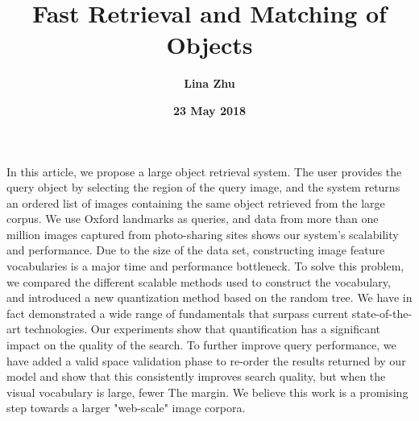 \documentclass[a4paper,12pt]{article}
\begin{document}
%
 \title{\textbf{\bfseries \LARGE Fast Retrieval and Matching of Objects} }
\author{\textbf{Lina Zhu}}
\date{\textbf{23 May 2018}}
\maketitle	
\par	In this article, we propose a large object retrieval system. The user provides the query object by selecting the region of the query image, and the system returns an ordered list of images containing the same object retrieved from the large corpus. We use Oxford landmarks as queries, and data from more than one million images captured from photo-sharing sites shows our system's scalability and performance. Due to the size of the data set, constructing image feature vocabularies is a major time and performance bottleneck. To solve this problem, we compared the different scalable methods used to construct the vocabulary, and introduced a new quantization method based on the random tree. We have in fact demonstrated a wide range of fundamentals that surpass current state-of-the-art technologies. Our experiments show that quantification has a significant impact on the quality of the search. To further improve query performance, we have added a valid space validation phase to re-order the results returned by our model and show that this consistently improves search quality, but when the visual vocabulary is large, fewer The margin. We believe this work is a promising step towards a larger "web-scale" image corpora.
\end{document}
